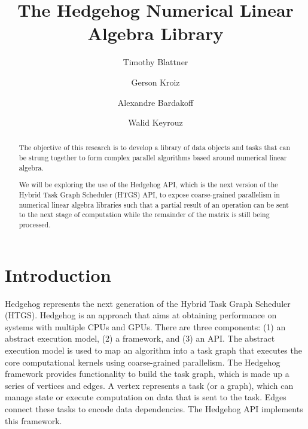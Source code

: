 \documentclass[]{article}
\begin{document}
\title{The Hedgehog Numerical Linear Algebra Library}

\author{Timothy Blattner \and Gerson Kroiz \and Alexandre Bardakoff \and Walid Keyrouz}



%
%



\maketitle

\begin{abstract}
	The objective of this research is to develop a library of data objects and tasks that can be strung together to form complex parallel algorithms based around numerical linear algebra.
	
	We will be exploring the use of the Hedgehog API, which is the next version of the Hybrid Task Graph Scheduler (HTGS) API, to expose coarse-grained parallelism in numerical linear algebra libraries such that a partial result of an operation can be sent to the next stage of computation while the remainder of the matrix is still being processed.	
\end{abstract}

\section{Introduction}

Hedgehog represents the next generation of the Hybrid Task Graph Scheduler (HTGS). Hedgehog is an approach that aims at obtaining performance on systems with multiple CPUs and GPUs. There are three components: (1) an abstract execution model, (2) a framework, and (3) an API. The abstract execution model is used to map an algorithm into a task graph that executes the core computational kernels using coarse-grained parallelism. The Hedgehog framework provides functionality to build the task graph, which is made up a series of vertices and edges. A vertex represents a task (or a graph), which can manage state or execute computation on data that is sent to the task. Edges connect these tasks to encode data dependencies. The Hedgehog API implements this framework.
\end{document}
